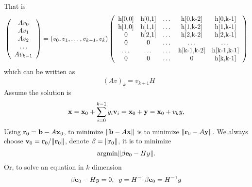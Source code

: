 That is
\begin{equation}
\begin{split}
&\left(\begin{array}{c}Av_0 \\ Av_1 \\ Av_2 \\ \ldots \\ Av_{k-1}\end{array}\right)=\left(v_0,v_1,\ldots,v_{k-1},v_k\right)\left(\begin{array}{ccccc}
$h[0,0]$ & $h[0,1]$ & $\ldots$ & $h[0,k-2]$ & $h[0,k-1]$ \\
$h[1,0]$ & $h[1,1]$ & $\ldots$ & $h[1,k-2]$ & $h[1,k-1]$ \\
$0$ & $h[2,1]$ & $\ldots$ & $h[2,k-2]$ & $h[2,k-1]$ \\
$0$ & $0$ & $\ldots$ & $\ldots$ & $\ldots$ \\
$\ldots$ & $\ldots$ & $\ldots$ & $h[k-1,k-2]$ & $h[k-1,k-1]$ \\
$0$ & $0$ & $\ldots$ & $0$ & $h[k,k-1]$ \\
\end{array}\right)\\
\end{split}
\end{equation}
which can be written as
\begin{equation}
\begin{split}
&(Av)_k=v_{k+1}H
\end{split}
\label{eq,gemres.1}
\end{equation}
Assume the solution is
\begin{equation}
\begin{split}
&{\bf x}={\bf x}_0 + \sum _{i=0}^{k-1} y_i {\bf v}_i={\bf x}_0+{\bf y}={\bf x}_0+v_ky,\\
\end{split}
\end{equation}
Using ${\bf r}_0={\bf b}-A{\bf x}_0$, to minimize $\|{\bf b}-A{\bf x}\|$ is to minimize $\|{\bf r}_0-A{\bf y}\|$. We always choose ${\bf v}_0={\bf r}_0/\|{\bf r}_0\|$, denote $\beta = \|{\bf r}_0\|$, it is to minimize
\begin{equation}
\begin{split}
&{\rm argmin}\|\beta {\bf e}_0 - Hy\|.\\
\end{split}
\end{equation}
Or, to solve an equation in $k$ dimension
\begin{equation}
\begin{split}
&\beta {\bf e}_0 - Hy=0,\;\;y=H^{-1}\beta {\bf e}_0=H^{-1} g\\
\end{split}
\end{equation}

